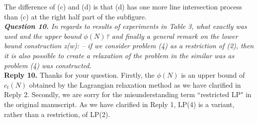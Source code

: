 \documentclass[11pt]{article}
\begin{document}
The difference of (c) and (d) is that (d) has one more line intersection process than (c) at the right half part of the subfigure.
~\\[4mm]
\noindent \textit{\textbf{Question 10.}
In regards to results of experiments in Table 3, what exactly was used and the upper bound $\phi(N)$? and finally a general remark on the lower bound construction z(w):
-- if we consider problem (4) as a restriction of (2), then it is also possible to create a relaxation of the problem in the similar was as problem (4) was constructed.}
\\[2mm]
\noindent \textbf{Reply 10.}
Thanks for your question. Firstly, the $\phi(N)$ is an upper bound of $c_t(N)$ obtained by the Lagrangian relaxation method as we have clarified in Reply 2.
Secondly, we are sorry for the misunderstanding term ``restricted LP" in the original manuscript.
As we have clarified in Reply 1, LP(4) is a variant, rather than a restriction, of LP(2).
~\\[4mm]


%
%
%
%
%
%
%
%
\end{document}
